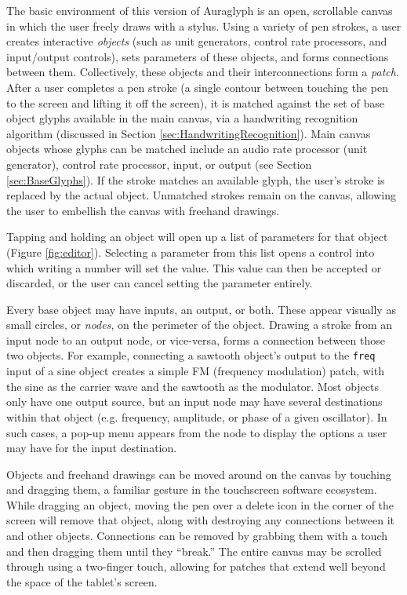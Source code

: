 \documentclass[10pt,letterpaper]{article}
\begin{document}
The basic environment of this version of Auraglyph is an open, scrollable canvas in which the user freely draws with a stylus. 
Using a variety of pen strokes, a user creates interactive \emph{objects} (such as unit generators, control rate processors, and input/output controls), sets parameters of these objects, and forms connections between them. 
Collectively, these objects and their interconnections form a \emph{patch}. 
After a user completes a pen stroke (a single contour between touching the pen to the screen and lifting it off the screen), it is matched against the set of base object glyphs available in the main canvas, via a handwriting recognition algorithm (discussed in Section \ref{sec:HandwritingRecognition}). 
Main canvas objects whose glyphs can be matched include an audio rate processor (unit generator), control rate processor, input, or output (see Section \ref{sec:BaseGlyphs}). 
If the stroke matches an available glyph, the user's stroke is replaced by the actual object. 
Unmatched strokes remain on the canvas, allowing the user to embellish the canvas with freehand drawings. 

Tapping and holding an object will open up a list of parameters for that object (Figure \ref{fig:editor}). 
Selecting a parameter from this list opens a control into which writing a number will set the value. 
This value can then be accepted or discarded, or the user can cancel setting the parameter entirely. 

Every base object may have inputs, an output, or both. These appear visually as small circles, or \emph{nodes}, on the perimeter of the object. 
Drawing a stroke from an input node to an output node, or vice-versa, forms a connection between those two objects. 
For example, connecting a sawtooth object's output to the \texttt{freq} input of a sine object creates a simple FM (frequency modulation) patch, with the sine as the carrier wave and the sawtooth as the modulator. 
Most objects only have one output source, but an input node may have several destinations within that object (e.g. frequency, amplitude, or phase of a given oscillator). 
In such cases, a pop-up menu appears from the node to display the options a user may have for the input destination. 

Objects and freehand drawings can be moved around on the canvas by touching and dragging them, a familiar gesture in the touchscreen software ecosystem. 
While dragging an object, moving the pen over a delete icon in the corner of the screen will remove that object, along with destroying any connections between it and other objects. 
Connections can be removed by grabbing them with a touch and then dragging them until they ``break.''
The entire canvas may be scrolled through using a two-finger touch, allowing for patches that extend well beyond the space of the tablet's screen. 
\end{document}
